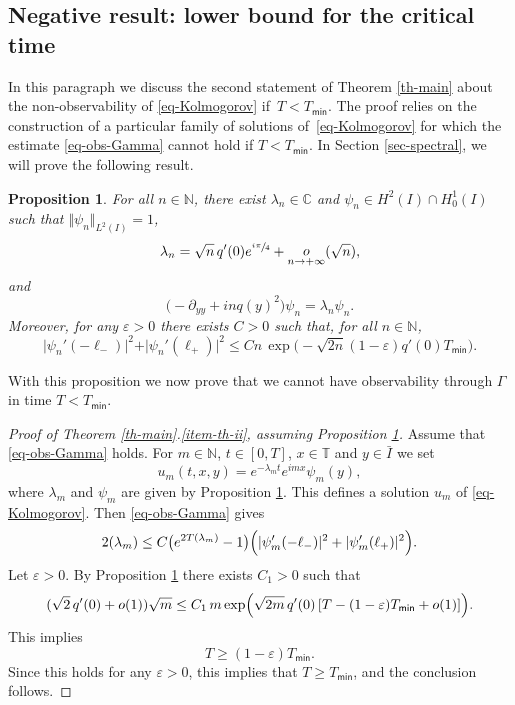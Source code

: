 \documentclass[11pt]{article}
\numberwithin{equation}{section}
\theoremstyle{plain}
\newtheorem{proposition}[theorem]{Proposition}
\theoremstyle{definition}
\newcommand{\abs}[1]{\vert #1\vert}
\newcommand{\littleo}[2]{\mathop{o}\limits_{#1 \to #2}}
\newcommand{\1}{\mathds 1}
\let\Re\relax
\DeclareMathOperator{\Re}{\mathsf{Re}\mkern2mu}
\def\C{\mathbb{C}}
\newcommand{\N}{\mathbb{N}}
\newcommand{\T}{\mathbb{T}}
\let\G\Gamma
\let\e\varepsilon
\let\l\lambda
\newcommand{\Tmin}{T_{\mathsf{min}}}
\begin{document}
\subsection{Negative result: lower bound for the critical time}

In this paragraph we discuss the second statement of Theorem \ref{th-main} about the non-observability of \eqref{eq-Kolmogorov} if~$T < \Tmin$. The proof relies on the construction of a particular family of solutions of~\eqref{eq-Kolmogorov} for which the estimate \eqref{eq-obs-Gamma} cannot hold if $T < \Tmin$. In Section \ref{sec-spectral}, we will prove the following result.

\begin {proposition}\label{prop-ln-psin}
For all $n \in \N$, there exist $\l_n \in \C$ and $\psi_n \in H^2(I) \cap H_0^1(I)$ such that $\Vert \psi_n \Vert_{L^2(I)} = 1$,
\begin{equation} \label{eq-lambda-n}
\l_n = \sqrt n\, q'(0) e^{\sfrac {i\pi}4} + \littleo{n}{+\infty}(\sqrt n),
\end{equation}
and
\[
\bigl(-\partial_{yy} + inq(y)^2 \bigr)\psi_n = \l_n \psi_n.
\]
Moreover, for any $\e > 0$ there exists $C > 0$ such that, for all $n \in \N$,
\begin{equation} \label{eq-Agmon-psi-n}
\vert \psi_n'(-\ell_-) \vert^2 + \vert \psi_n'(\ell_+) \vert^2 \leq
C n\, \exp\bigl(-\sqrt{2n}(1-\varepsilon) q'(0) \Tmin \bigr).
\end{equation}
\end{proposition}

With this proposition we now prove that we cannot have observability through $\G$ in time $T < \Tmin$.

\begin{proof}[Proof of Theorem \ref{th-main}.\eqref{item-th-ii}, assuming Proposition \ref{prop-ln-psin}]
Assume that \eqref{eq-obs-Gamma} holds. For $m \in \N$, $t \in [0,T]$, $x \in \T$ and $y \in \bar I$ we set
\[
u_m(t,x,y) = e^{-\lambda_m t} e^{i m x} \psi_m(y),
\]
where $\l_m$ and $\psi_m$ are given by Proposition \ref{prop-ln-psin}. This defines a solution $u_m$ of \eqref{eq-Kolmogorov}. Then \eqref{eq-obs-Gamma} gives
\[
2 \Re(\l_m) \leq C \bigl(e^{2T \Re(\l_m)}-1\bigr) \Bigl(\abs{\psi_m'(-\ell_-)}^2 + \abs{\psi_m'(\ell_+)}^2 \Bigr).
\]
Let $\varepsilon > 0$. By Proposition \ref{prop-ln-psin} there exists $C_1 > 0$ such that
\[
(\sqrt{2}\, q'(0) + o(1))\sqrt{m} \leq C_1 \, m \exp\Bigl(\sqrt{2m}\, q'(0) \left[ T - (1-\varepsilon) \Tmin + o(1) \right] \Bigr).
\]
This implies
\[
T \geq (1-\varepsilon) \Tmin.
\]
Since this holds for any $\e > 0$, this implies that $T \geq \Tmin$, and the conclusion follows.
\end{proof}
\end{document}
